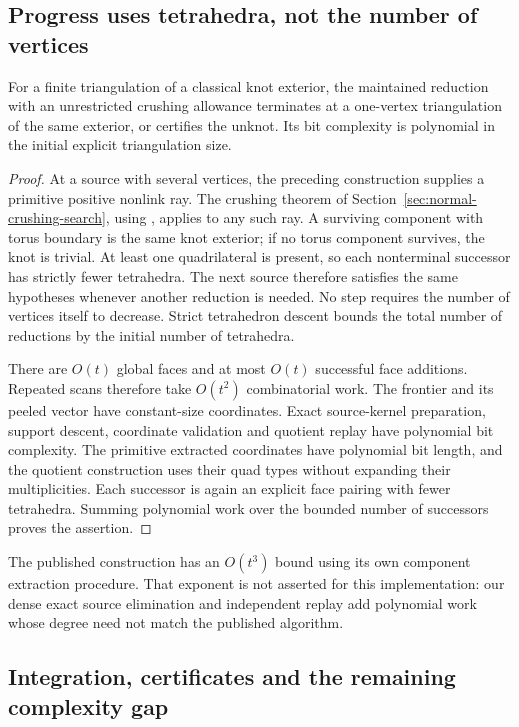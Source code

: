 \subsection{Progress uses tetrahedra, not the number of vertices}

\begin{proposition}
For a finite triangulation of a classical knot exterior, the maintained
reduction with an unrestricted crushing allowance terminates at a one-vertex
triangulation of the same exterior, or certifies the unknot.  Its bit
complexity is polynomial in the initial explicit triangulation size.
\end{proposition}
\begin{proof}
At a source with several vertices, the preceding construction supplies a
primitive positive nonlink ray.  The crushing theorem of
Section~\ref{sec:normal-crushing-search}, using
\cite[Lemma~5]{burton-ozlen}, applies to any such ray.  A surviving component
with torus boundary is the same knot exterior; if no torus component
survives, the knot is trivial.  At least one quadrilateral is present, so
each nonterminal successor has strictly fewer tetrahedra.  The next source
therefore satisfies the same hypotheses whenever another reduction is
needed.  No step requires the number of vertices itself to decrease.
Strict tetrahedron descent bounds the total number of reductions by the
initial number of tetrahedra.

There are $O(t)$ global faces and at most $O(t)$ successful face additions.
Repeated scans therefore take $O(t^2)$ combinatorial work.  The frontier
and its peeled vector have constant-size coordinates.  Exact source-kernel
preparation, support descent, coordinate validation and quotient replay
have polynomial bit complexity.  The primitive extracted coordinates have
polynomial bit length, and the quotient construction uses their quad
types without expanding their multiplicities.  Each successor is again
an explicit face pairing with fewer tetrahedra.  Summing polynomial work
over the bounded number of successors proves the assertion.
\end{proof}

The published construction has an $O(t^3)$ bound using its own component
extraction procedure.  That exponent is not asserted for this implementation:
our dense exact source elimination and independent replay add polynomial
work whose degree need not match the published algorithm.

\subsection{Integration, certificates and the remaining complexity gap}

